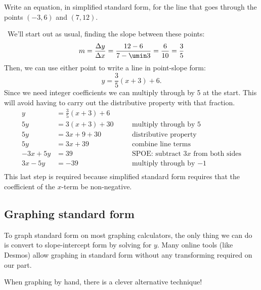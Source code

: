 \begin{boxedex}
Write an equation, in simplified standard form, for the line that goes through the points $(-3, 6)$ and $(7, 12)$.

\exsoln\ We'll start out as usual, finding the slope between these points: \[m=\frac{\Delta y}{\Delta x} = \frac{12-6}{7-\umin3} = \frac{6}{10} = \frac{3}{5}\]
Then, we can use either point to write a line in point-slope form: \[y=\frac{3}{5}(x+3)+6.\] Since we need integer coefficients we can multiply through by 5 at the start. This will avoid having to carry out the distributive property with that fraction.
\[\begin{aligned}
y &= \frac{3}{5}(x+3)+6\\
5y &= 3(x+3)+30
&& \quad\text{multiply through by 5}\\
5y &= 3x+9+30
&& \quad\text{distributive property}\\
5y &= 3x+39
&& \quad\text{combine line terms}\\
-3x + 5y &= 39
&& \quad\text{SPOE: subtract $3x$ from both sides}\\
3x - 5y &= -39
&& \quad\text{multiply through by $-1$}\\
\end{aligned}\]
This last step is required because simplified standard form requires that the coefficient of the $x$-term be non-negative.
\end{boxedex}

\subsection{Graphing standard form}

To graph standard form on most graphing calculators, the only thing we can do is convert to slope-intercept form by solving for $y$. Many online tools (like Desmos) allow graphing in standard form without any transforming required on our part.

When graphing by hand, there is a clever alternative technique!

